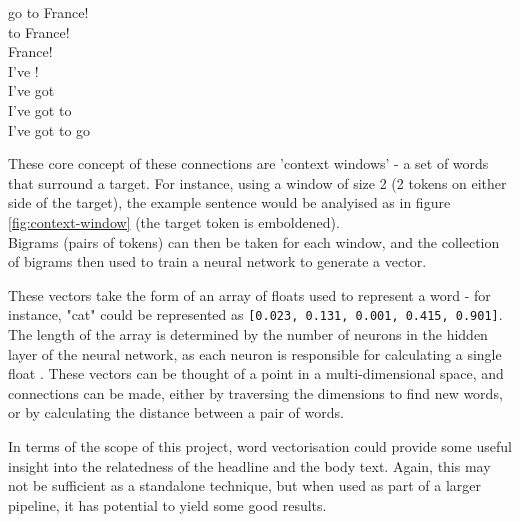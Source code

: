 \begin{minipage}{1.5in}

\end{minipage}

\begin{minipage}{0.4\textwidth}
\begin{center}
 go to France!\\ \vspace{1mm}
 to France!\\ \vspace{1mm}
 France!\\ \vspace{1mm}
I've !\\ \vspace{1mm}
I've got \\ \vspace{1mm}
I've got to \\ \vspace{1mm}
I've got to go \\ 
\end{center}
\label{fig:context-window}

\end{minipage}
\begin{minipage}{0.5\textwidth}
These core concept of these connections are 'context windows' - a set of words that surround a target. For instance, using a window of size 2 (2 tokens on either side of the target), the example sentence would be analyised as in figure \ref{fig:context-window} (the target token is emboldened).\\
Bigrams (pairs of tokens) can then be taken for each window, and the collection of bigrams then used to train a neural network to generate a vector.
\end{minipage}

\vspace{2mm}

These vectors take the form of an array of floats used to represent a word - for instance, "cat" could be represented as \texttt{[0.023, 0.131, 0.001, 0.415, 0.901]}. The length of the array is determined by the number of neurons in the hidden layer of the neural network, as each neuron is responsible for calculating a single float \cite{bommana2019}. These vectors can be thought of a point in a multi-dimensional space, and connections can be made, either by traversing the dimensions to find new words, or by calculating the distance between a pair of words.

In terms of the scope of this project, word vectorisation could provide some useful insight into the relatedness of the headline and the body text. Again, this may not be sufficient as a standalone technique, but when used as part of a larger pipeline, it has potential to yield some good results.